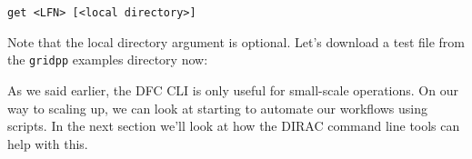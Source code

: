 \begin{verbatim}
get <LFN> [<local directory>]
\end{verbatim}

Note that the local directory argument is optional. Let's download a
test file from the \texttt{gridpp} examples directory now:

\begin{Shaded}
\begin{Highlighting}[]
\NormalTok{:/}\KeywordTok{>} 
\NormalTok{:/}\KeywordTok{>} 
\NormalTok{$ } 

 
\NormalTok{$ } 
\end{Highlighting}
\end{Shaded}

As we said earlier, the DFC CLI is only useful for small-scale
operations. On our way to scaling up, we can look at starting to
automate our workflows using scripts. In the next section we'll look at
how the DIRAC command line tools can help with this.

